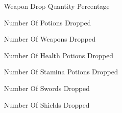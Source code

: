 \documentclass[a4paper,11pt]{report}
\begin{document}
\begin{description}
\item[\parbox{1.25 in}{$E$}] Weapon Drop Quantity Percentage
\item[\parbox{1.25 in}{$N_p$}] Number Of Potions Dropped
\item[\parbox{1.25 in}{$N_e$}] Number Of Weapons Dropped
\item[\parbox{1.25 in}{$N_hp$}] Number Of Health Potions Dropped
\item[\parbox{1.25 in}{$N_st$}] Number Of Stamina Potions Dropped
\item[\parbox{1.25 in}{$N_a$}] Number Of Swords Dropped
\item[\parbox{1.25 in}{$N_d$}] Number Of Shields Dropped


\end{description}

\newpage
\printglossary
\newpage
















\appendix


\newpage
\nocite{*}
 


\end{document}
